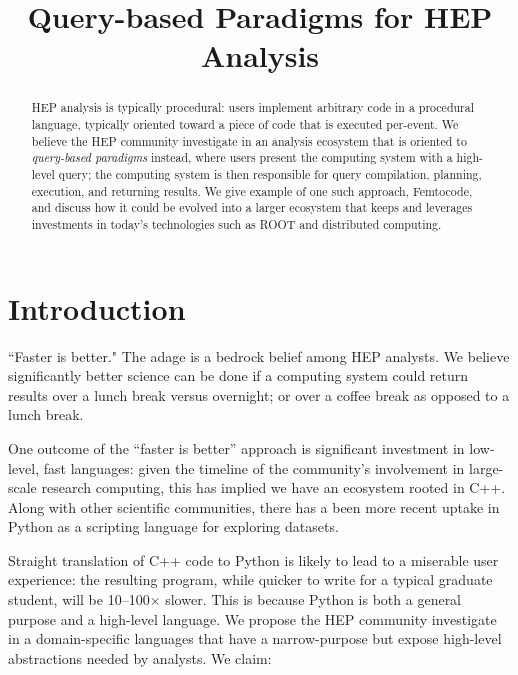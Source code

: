 \documentclass{article}
\begin{document}
\title{Query-based Paradigms for HEP Analysis}

\maketitle

\begin{abstract}
HEP analysis is typically procedural: users implement arbitrary code in a procedural language, typically oriented toward a piece of code that is executed per-event. We believe the HEP community investigate in an analysis ecosystem that is oriented to \textit{query-based paradigms} instead, where users present the computing system with a high-level query; the computing system is then responsible for query compilation, planning, execution, and returning results. We give example of one such approach, Femtocode, and discuss how it could be evolved into a larger ecosystem that keeps and leverages investments in today's technologies such as ROOT and distributed computing.
\end{abstract}

\section{Introduction}

``Faster is better." The adage is a bedrock belief among HEP analysts. We believe significantly better science can be done if a computing system could return results over a lunch break versus overnight; or over a coffee break as opposed to a lunch break.

One outcome of the ``faster is better'' approach is significant investment in low-level, fast languages: given the timeline of the community's involvement in large-scale research computing, this has implied we have an ecosystem rooted in C++. Along with other scientific communities, there has a been more recent uptake in Python as a scripting language for exploring datasets.

Straight translation of C++ code to Python is likely to lead to a miserable user experience: the resulting program, while quicker to write for a typical graduate student, will be 10--100$\times$ slower. This is because Python is both a general purpose and a high-level language. We propose the HEP community investigate in a domain-specific languages that have a narrow-purpose but expose high-level abstractions needed by analysts\footnotemark. We claim:

\end{document}
